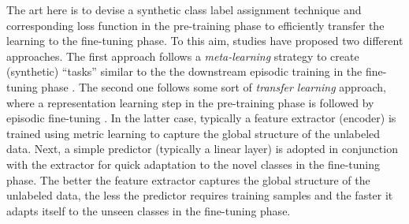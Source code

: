 \documentclass{article}
\begin{document}
The art here is to devise a synthetic class label assignment technique and corresponding loss function in the pre-training phase to efficiently transfer the learning to the fine-tuning phase. To this aim, studies have proposed two different approaches. The first approach follows a \emph{meta-learning} strategy to create (synthetic) ``tasks'' similar to the the downstream episodic training in the fine-tuning phase \citep{Finn2017Model-agnosticNetworks, Hsu2018UnsupervisedMeta-Learning, Khodadadeh2018UnsupervisedClassification}. The second one follows some sort of \emph{transfer learning} approach, where a representation learning step in the pre-training phase is followed by episodic fine-tuning \citep{Medina2020Self-SupervisedClassification, goodemballneed2020, dhillon2019baseline}. In the latter case, typically a feature extractor (encoder) is trained using metric learning to capture the global structure of the unlabeled data. Next, a simple predictor (typically a linear layer) is adopted in conjunction with the extractor for quick adaptation to the novel classes in the fine-tuning phase. The better the feature extractor captures the global structure of the unlabeled data, the less the predictor requires training samples and the faster it adapts itself to the unseen classes in the fine-tuning phase. 
\end{document}

